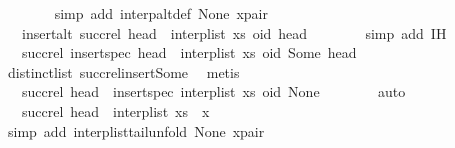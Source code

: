 \begin{isabellebody}
\ \ \ \ \ \ \isamarkupfalse%
\ {\isacharparenleft}simp\ add{\isacharcolon}\ interp{\isacharunderscore}alt{\isacharunderscore}def\ None\ x{\isacharunderscore}pair{\isacharparenright}\isanewline
\ \ \ \ \isamarkupfalse%
\ \isamarkupfalse%
\ {\isachardoublequoteopen}{\isachardot}{\isachardot}{\isachardot}\ {\isacharequal}\ insert{\isacharunderscore}alt\ {\isacharparenleft}succ{\isacharunderscore}rel\ {\isacharparenleft}head\ {\isacharhash}\ interp{\isacharunderscore}list\ xs{\isacharparenright}{\isacharparenright}\ {\isacharparenleft}oid{\isacharcomma}\ head{\isacharparenright}{\isachardoublequoteclose}\isanewline
\ \ \ \ \ \ \isamarkupfalse%
\ {\isacharparenleft}simp\ add{\isacharcolon}\ IH{\isacharparenright}\isanewline
\ \ \ \ \isamarkupfalse%
\ \isamarkupfalse%
\ {\isachardoublequoteopen}{\isachardot}{\isachardot}{\isachardot}\ {\isacharequal}\ succ{\isacharunderscore}rel\ {\isacharparenleft}insert{\isacharunderscore}spec\ {\isacharparenleft}head\ {\isacharhash}\ interp{\isacharunderscore}list\ xs{\isacharparenright}\ {\isacharparenleft}oid{\isacharcomma}\ Some\ head{\isacharparenright}{\isacharparenright}{\isachardoublequoteclose}\isanewline
\ \ \ \ \ \ \isamarkupfalse%
\ distinct{\isacharunderscore}list\ succ{\isacharunderscore}rel{\isacharunderscore}insert{\isacharunderscore}Some\ \isamarkupfalse%
\ metis\isanewline
\ \ \ \ \isamarkupfalse%
\ \isamarkupfalse%
\ {\isachardoublequoteopen}{\isachardot}{\isachardot}{\isachardot}\ {\isacharequal}\ succ{\isacharunderscore}rel\ {\isacharparenleft}head\ {\isacharhash}\ {\isacharparenleft}insert{\isacharunderscore}spec\ {\isacharparenleft}interp{\isacharunderscore}list\ xs{\isacharparenright}\ {\isacharparenleft}oid{\isacharcomma}\ None{\isacharparenright}{\isacharparenright}{\isacharparenright}{\isachardoublequoteclose}\isanewline
\ \ \ \ \ \ \isamarkupfalse%
\ auto\isanewline
\ \ \ \ \isamarkupfalse%
\ \isamarkupfalse%
\ {\isachardoublequoteopen}{\isachardot}{\isachardot}{\isachardot}\ {\isacharequal}\ succ{\isacharunderscore}rel\ {\isacharparenleft}head\ {\isacharhash}\ {\isacharparenleft}interp{\isacharunderscore}list\ {\isacharparenleft}xs\ {\isacharat}\ {\isacharbrackleft}x{\isacharbrackright}{\isacharparenright}{\isacharparenright}{\isacharparenright}{\isachardoublequoteclose}\isanewline
\ \ \ \ \ \ \isamarkupfalse%
\ {\isacharparenleft}simp\ add{\isacharcolon}\ interp{\isacharunderscore}list{\isacharunderscore}tail{\isacharunderscore}unfold\ None\ x{\isacharunderscore}pair{\isacharparenright}\isanewline

\end{isabellebody}
